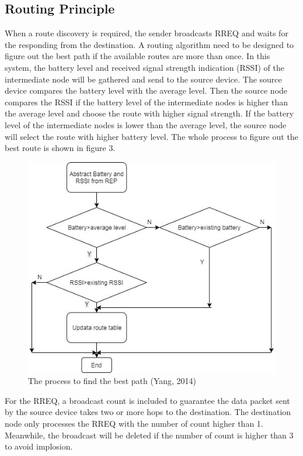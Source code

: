\documentclass[a4paper]{article}
\begin{document}
\subsection{Routing Principle}
When a route discovery is required, the sender broadcasts RREQ and waits for the responding from the destination. A routing algorithm need to be designed to figure out the best path if the available routes are more than once. In this system, the battery level and received signal strength indication (RSSI) of the intermediate node will be gathered and send to the source device. The source device compares the battery level with the average level. Then the source node compares the RSSI if the battery level of the intermediate nodes is higher than the average level and choose the route with higher signal strength. If the battery level of the intermediate nodes is lower than the average level, the source node will select the route with higher battery level. The whole process to figure out the best route is shown in figure 3.

\begin{figure}[!htb] 
  \centering
  \includegraphics[scale=0.6]{routingdiagram}
  \begin{center}
  	\caption{The process to find the best path (Yang, 2014)}
  \end{center} 
  \label{fig:protocolstack2} 
\end{figure}


For the RREQ, a broadcast count is included to guarantee the data packet sent by the source device takes two or more hops to the destination. The destination node only processes the RREQ with the number of count higher than 1. Meanwhile, the broadcast will be deleted if the number of count is higher than 3 to avoid implosion.
\end{document}
